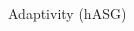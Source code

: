 \documentclass[final]{beamer}
\newcommand {\bxi} {\mbox{\boldmath $\xi$}}%
\begin{document}
\begin{frame}{}
{\begin{columns}[t]
\begin{column}{.30\linewidth}
\begin{block}{\centering Adaptivity (hASG)}
%

\end{block}

 \end{column}
        
\begin{column}{.30\linewidth}


\end{column}
\end{columns}}
\end{frame}
\end{document}
